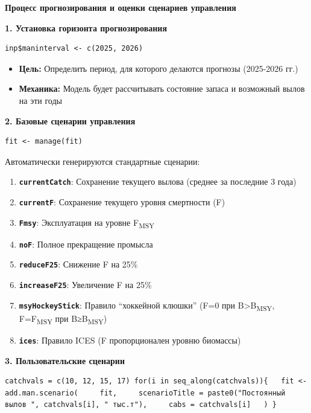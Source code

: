\documentclass[
  letterpaper,
  DIV=11,
  numbers=noendperiod]{scrreprt}
\providecommand{\tightlist}{%
  \setlength{\itemsep}{0pt}\setlength{\parskip}{0pt}}
\begin{document}
\textbf{Процесс прогнозирования и оценки сценариев управления}

\textbf{1. Установка горизонта прогнозирования}

\begin{verbatim}
inp$maninterval <- c(2025, 2026)
\end{verbatim}

\begin{itemize}
\tightlist
\item
  \textbf{Цель:} Определить период, для которого делаются прогнозы
  (2025-2026 гг.)
\item
  \textbf{Механика:} Модель будет рассчитывать состояние запаса и
  возможный вылов на эти годы
\end{itemize}

\textbf{2. Базовые сценарии управления}

\begin{verbatim}
fit <- manage(fit)
\end{verbatim}

Автоматически генерируются стандартные сценарии:

\begin{enumerate}
\def\labelenumi{\arabic{enumi}.}
\tightlist
\item
  \textbf{\texttt{currentCatch}}: Сохранение текущего вылова (среднее за
  последние 3 года)
\item
  \textbf{\texttt{currentF}}: Сохранение текущего уровня смертности (F)
\item
  \textbf{\texttt{Fmsy}}: Эксплуатация на уровне F\textsubscript{MSY}
\item
  \textbf{\texttt{noF}}: Полное прекращение промысла
\item
  \textbf{\texttt{reduceF25}}: Снижение F на 25\%
\item
  \textbf{\texttt{increaseF25}}: Увеличение F на 25\%
\item
  \textbf{\texttt{msyHockeyStick}}: Правило ``хоккейной клюшки'' (F=0
  при B\textgreater B\textsubscript{MSY}, F=F\textsubscript{MSY} при
  B≥B\textsubscript{MSY})
\item
  \textbf{\texttt{ices}}: Правило ICES (F пропорционален уровню
  биомассы)
\end{enumerate}

\textbf{3. Пользовательские сценарии}

\begin{verbatim}
catchvals = c(10, 12, 15, 17) for(i in seq_along(catchvals)){   fit <- add.man.scenario(     fit,     scenarioTitle = paste0("Постоянный вылов ", catchvals[i], " тыс.т"),     cabs = catchvals[i]   ) }
\end{verbatim}
\end{document}
